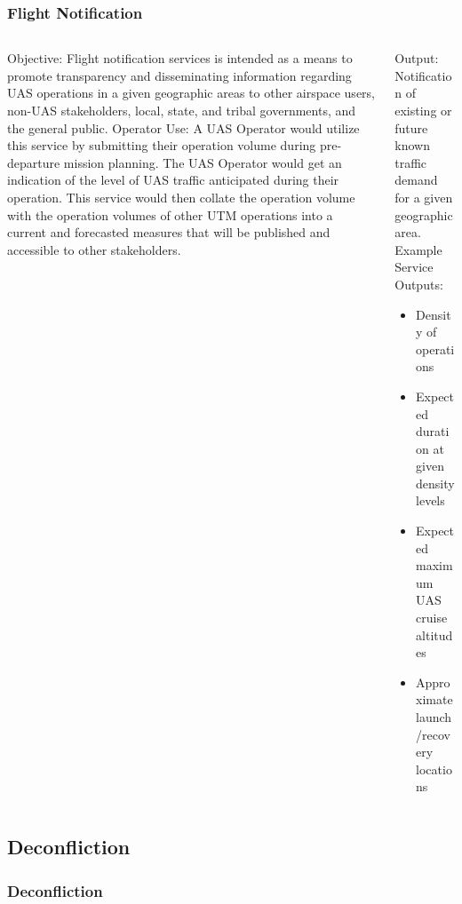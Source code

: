 \documentclass[usenames,dvipsnames,aspectratio=169,serif]{beamer}
\begin{document}
\begin{frame}
   \frametitle{Flight Notification}
   \begin{columns}[t]
      \begin{column}{0.5\textwidth}
         Objective: Flight notification services is intended as a means to promote transparency and disseminating information regarding UAS operations in a given geographic areas to other airspace users, non-UAS stakeholders, local, state, and tribal governments, and the general public.
         Operator Use: A UAS Operator would utilize this service by submitting their operation volume during pre-departure mission planning. The UAS Operator would get an indication of the level of UAS traffic anticipated during their operation. This service would then collate the operation volume with the operation volumes of other UTM operations into a current and forecasted measures that will be published and accessible to other stakeholders.
      \end{column}
      \begin{column}{0.5\textwidth}
         Output: Notification of existing or future known traffic demand for a given geographic area.
         Example Service Outputs:
         \begin{itemize}
         \item  Density of operations
         \item  Expected duration at given density levels
         \item  Expected maximum UAS cruise altitudes
         \item  Approximate launch/recovery locations
         \end{itemize}
      \end{column}
   \end{columns}
\end{frame}


\subsection{Deconfliction}

\begin{frame}
   \frametitle{Deconfliction}
   \begin{columns}[t]
      \begin{column}{0.5\textwidth}
      \end{column}
      \begin{column}{0.5\textwidth}
      \end{column}
   \end{columns}
\end{frame}
\end{document}
